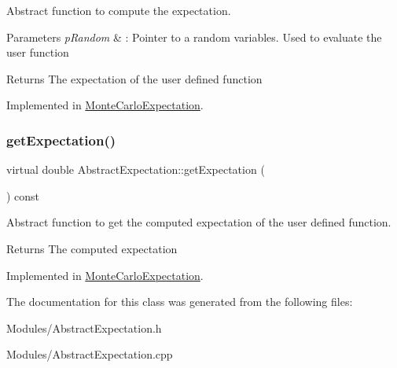 Abstract function to compute the expectation. 


\begin{DoxyParams}{Parameters}
{\em p\+Random} & \+: Pointer to a random variables. Used to evaluate the user function \\
\hline
\end{DoxyParams}
\begin{DoxyReturn}{Returns}
The expectation of the user defined function 
\end{DoxyReturn}


Implemented in \hyperlink{classMonteCarloExpectation_a3ded4ade26374189ab6d79f2c6928b0a}{Monte\+Carlo\+Expectation}.

\mbox{\label{classAbstractExpectation_a256d47c871d941e081a17194dda4d774}} 
\subsubsection{\texorpdfstring{get\+Expectation()}{getExpectation()}}
{\footnotesize\ttfamily virtual double Abstract\+Expectation\+::get\+Expectation (\begin{DoxyParamCaption}{ }\end{DoxyParamCaption}) const\hspace{0.3cm}{\ttfamily [pure virtual]}}



Abstract function to get the computed expectation of the user defined function. 

\begin{DoxyReturn}{Returns}
The computed expectation 
\end{DoxyReturn}


Implemented in \hyperlink{classMonteCarloExpectation_a0cadc5362ae4d9073f4131ed9208053c}{Monte\+Carlo\+Expectation}.



The documentation for this class was generated from the following files\+:\begin{DoxyCompactItemize}
\item 
Modules/Abstract\+Expectation.\+h\item 
Modules/Abstract\+Expectation.\+cpp\end{DoxyCompactItemize}
